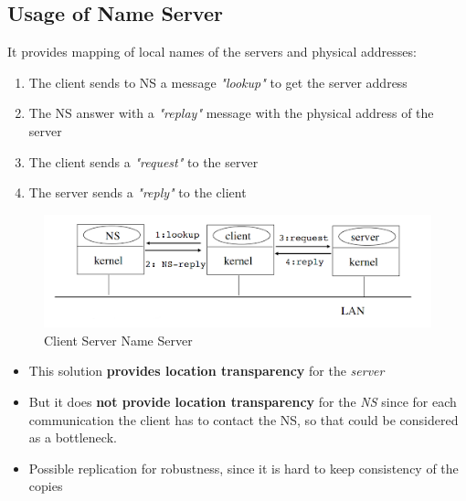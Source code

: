\subsection{Usage of Name Server}
It provides mapping of local names of the servers and physical addresses:
\begin{enumerate}
    \item The client sends to NS a message \textit{"lookup"} to get the server address
    \item The NS answer with a \textit{"replay"} message with the physical address of the server
    \item The client sends a \textit{"request"} to the server
    \item The server sends a \textit{"reply"} to the client
\end{enumerate}
\begin{figure}[!h]
            \centering
            \includegraphics[width=.7\linewidth]{images/clientServerCommunication/clientServerNS.png}
            \caption{Client Server Name Server}
    \end{figure}
\begin{itemize}
    \item This solution \textbf{provides location transparency} for the \textit{server}
    \item But it does \textbf{not provide location transparency} for the \textit{NS} since for each communication the client has to contact the NS, so that could be considered as a bottleneck.
    \item Possible replication for robustness, since it is hard to keep consistency of the copies
\end{itemize}

